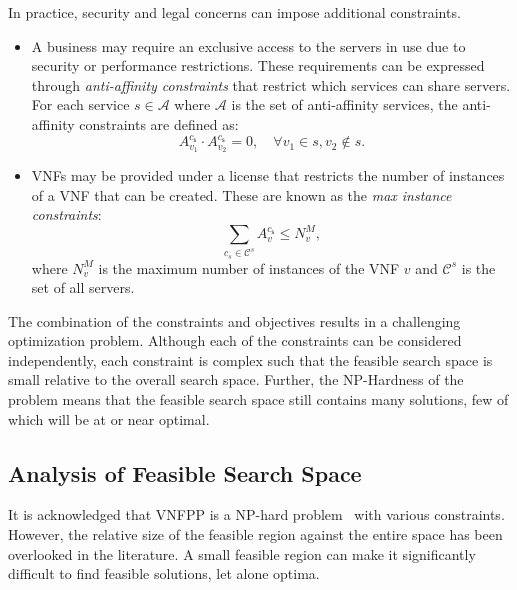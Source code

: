 In practice, security and legal concerns can impose additional constraints.
\begin{itemize}
	\setcounter{enumi}{3}
	\item A business may require an exclusive access to the servers in use due to security or performance restrictions. These requirements can be expressed through \textit{anti-affinity constraints} that restrict which services can share servers. For each service $s\in\mathcal{A}$ where $\mathcal{A}$ is the set of anti-affinity services, the anti-affinity constraints are defined as:
	      \begin{equation}
		      A^{c_{\mathsf{s}}}_{v_1}\cdot A^{c_{\mathsf{s}}}_{v_2}=0,\quad\forall v_1\in s, v_2\notin s.
	      \end{equation}

	\item VNFs may be provided under a license that restricts the number of instances of a VNF that can be created. These are known as the \textit{max instance constraints}:
	      \begin{equation}
		      \sum_{c_s\in\mathcal{C}^s} A_v^{c_{\mathsf{s}}}\leq N_v^M,
		      \label{eq:max_instances}
	      \end{equation}
	      where $N^M_v$ is the maximum number of instances of the VNF $v$ and $\mathcal{C}^{s}$ is the set of all servers.
\end{itemize}

The combination of the constraints and objectives results in a challenging optimization problem. Although each of the constraints can be considered independently, each constraint is complex such that the feasible search space is small relative to the overall search space. Further, the NP-Hardness of the problem means that the feasible search space still contains many solutions, few of which will be at or near optimal.

\subsection{Analysis of Feasible Search Space}
\label{sec:complexity}

It is acknowledged that VNFPP is a NP-hard problem~\cite{CohenLNR15,LuizelliCBG17,SangJGDY17} with various constraints. However, the relative size of the feasible region against the entire space has been overlooked in the literature. A small feasible region can make it significantly difficult to find feasible solutions, let alone optima.

